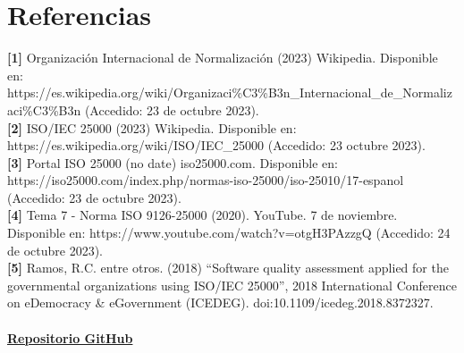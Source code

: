\documentclass[https://www.overleaf.com/project/63761df255a8a9f4a15c3579
	letterpaper, %
	10pt, %
]{CSUniSchoolLabReport}
\begin{document}
    \section{Referencias}
        \textbf{[1]}\hspace{0.5em} Organización Internacional de Normalización (2023) Wikipedia. Disponible en: https://es.wikipedia.org/wiki/Organizaci\%C3\%B3n_Internacional_de_Normalizaci\%C3\%B3n (Accedido: 23 de octubre 2023).
        \\
        \textbf{[2]}\hspace{0.5em} ISO/IEC 25000 (2023) Wikipedia. Disponible en: https://es.wikipedia.org/wiki/ISO/IEC_25000 (Accedido: 23 octubre 2023).
        \\
        \textbf{[3]}\hspace{0.5em} Portal ISO 25000 (no date) iso25000.com. Disponible en: https://iso25000.com/index.php/normas-iso-25000/iso-25010/17-espanol (Accedido: 23 de octubre  2023).
        \\
        \textbf{[4]}\hspace{0.5em} Tema 7 - Norma ISO 9126-25000 (2020). YouTube. 7 de noviembre. Disponible en: https://www.youtube.com/watch?v=otgH3PAzzgQ (Accedido: 24 de octubre 2023).
        \\
        \textbf{[5]}\hspace{0.5em} Ramos, R.C. entre otros. (2018) “Software quality assessment applied for the governmental organizations using ISO/IEC 25000”, 2018 International Conference on eDemocracy & eGovernment (ICEDEG). doi:10.1109/icedeg.2018.8372327.\\\\

    
    \href{https://github.com/DAOBLUR/SoftwareConstruction/tree/main/tasks/2} {\huge\faGithub \textbf{{Repositorio GitHub}} }
    
\end{document}
